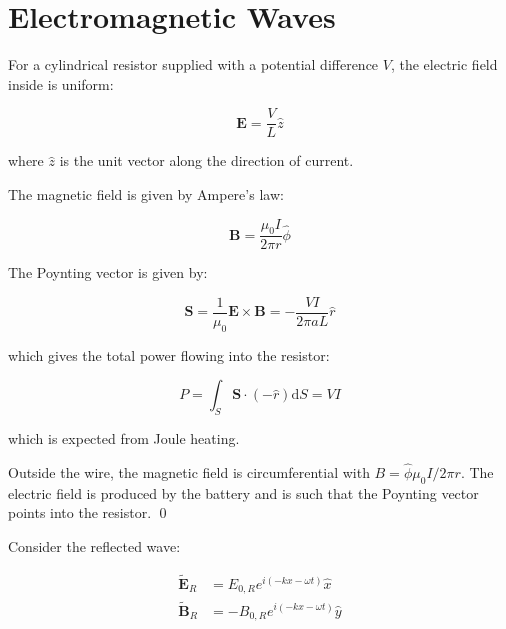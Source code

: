 \documentclass[12pt]{article}
\begin{document}



\pagebreak
\section*{Electromagnetic Waves}



For a cylindrical resistor supplied with a potential difference $V$, the electric field inside is uniform:

\begin{equation}
    \mathbf{E} = \frac{V}{L} \hat{z}
\end{equation}

where $\hat{z}$ is the unit vector along the direction of current.

The magnetic field is given by Ampere's law:

\begin{equation}
    \mathbf{B} = \frac{\mu_{0} I}{2\pi r} \hat{\phi}
\end{equation}

The Poynting vector is given by:

\begin{equation}
    \mathbf{S} = \frac{1}{\mu_{0}} \mathbf{E} \times \mathbf{B} = -\frac{VI}{2\pi aL} \hat{r}
\end{equation}

which gives the total power flowing into the resistor:

\begin{equation}
    P = \int_{S} \mathbf{S} \cdot (-\hat{r}) \mathrm{d}S = VI
\end{equation}

which is expected from Joule heating.

Outside the wire, the magnetic field is circumferential with $B = \hat{\phi} \mu_{0} I/2\pi r$. The electric field is produced by the battery and is such that the Poynting vector points into the resistor.
\qed



Consider the reflected wave:

\begin{equation}
\begin{split}
    \tilde{\mathbf{E}}_{R} &= E_{0,R} e^{i(-kx - \omega t)} \hat{x} \\
    \tilde{\mathbf{B}}_{R} &= -B_{0,R} e^{i(-kx - \omega t)} \hat{y}
\end{split}
\end{equation}
\end{document}
